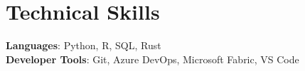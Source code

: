 \documentclass[letterpaper,11pt]{article}
\begin{document}
%
\section{Technical Skills}
 \begin{itemize}[leftmargin=0.15in, label={}]
    \small{\item{
     \textbf{Languages}{: Python, R, SQL, Rust} \\
     \textbf{Developer Tools}{: Git, Azure DevOps, Microsoft Fabric, VS Code} \\
    }}
 \end{itemize}


\end{document}
